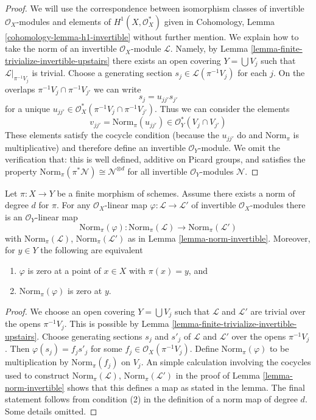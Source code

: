 \begin{proof}
We will use the correspondence between isomorphism classes of
invertible $\mathcal{O}_X$-modules and elements of
$H^1(X, \mathcal{O}_X^*)$ given in
Cohomology, Lemma \ref{cohomology-lemma-h1-invertible}
without further mention. We explain how to take the norm of an invertible
$\mathcal{O}_X$-module $\mathcal{L}$. Namely, by
Lemma \ref{lemma-finite-trivialize-invertible-upstairs}
there exists an open covering $Y = \bigcup V_j$ such that
$\mathcal{L}|_{\pi^{-1}V_j}$ is trivial. Choose a generating section
$s_j \in \mathcal{L}(\pi^{-1}V_j)$ for each $j$.
On the overlaps $\pi^{-1}V_j \cap \pi^{-1}V_{j'}$ we can write
$$
s_j = u_{jj'} s_{j'}
$$
for a unique $u_{jj'} \in \mathcal{O}^*_X(\pi^{-1}V_j \cap \pi^{-1}V_{j'})$.
Thus we can consider the elements
$$
v_{jj'} = \text{Norm}_\pi(u_{jj'}) \in \mathcal{O}_Y^*(V_j \cap V_{j'})
$$
These elements satisfy the cocycle condition (because the
$u_{jj'}$ do and $\text{Norm}_\pi$ is multiplicative) and
therefore define an invertible $\mathcal{O}_Y$-module.
We omit the verification that: this is well defined,
additive on Picard groups, and satisfies the property
$\text{Norm}_\pi(\pi^*\mathcal{N}) \cong \mathcal{N}^{\otimes d}$
for all invertible $\mathcal{O}_Y$-modules $\mathcal{N}$.
\end{proof}

\begin{lemma}
\label{lemma-norm-map-invertible}
Let $\pi : X \to Y$ be a finite morphism of schemes. Assume there exists
a norm of degree $d$ for $\pi$. For any $\mathcal{O}_X$-linear map
$\varphi : \mathcal{L} \to \mathcal{L}'$
of invertible $\mathcal{O}_X$-modules there is an $\mathcal{O}_Y$-linear
map
$$
\text{Norm}_\pi(\varphi) :
\text{Norm}_\pi(\mathcal{L})
\longrightarrow
\text{Norm}_\pi(\mathcal{L}')
$$
with $\text{Norm}_\pi(\mathcal{L})$, $\text{Norm}_\pi(\mathcal{L}')$
as in Lemma \ref{lemma-norm-invertible}. Moreover, for
$y \in Y$ the following are equivalent
\begin{enumerate}
\item $\varphi$ is zero at a point of $x \in X$ with $\pi(x) = y$, and
\item $\text{Norm}_\pi(\varphi)$ is zero at $y$.
\end{enumerate}
\end{lemma}

\begin{proof}
We choose an open covering $Y = \bigcup V_j$ such that
$\mathcal{L}$ and $\mathcal{L}'$ are trivial over the opens $\pi^{-1}V_j$.
This is possible by
Lemma \ref{lemma-finite-trivialize-invertible-upstairs}.
Choose generating sections
$s_j$ and $s'_j$ of $\mathcal{L}$ and $\mathcal{L}'$
over the opens $\pi^{-1}V_j$. Then $\varphi(s_j) = f_js'_j$
for some $f_j \in \mathcal{O}_X(\pi^{-1}V_j)$.
Define $\text{Norm}_\pi(\varphi)$ to be multiplication
by $\text{Norm}_\pi(f_j)$ on $V_j$. An simple
calculation involving the cocycles used to construct
$\text{Norm}_\pi(\mathcal{L})$, $\text{Norm}_\pi(\mathcal{L}')$
in the proof of Lemma \ref{lemma-norm-invertible}
shows that this defines
a map as stated in the lemma. The final statement follows
from condition (2) in the definition of a norm map of degree $d$.
Some details omitted.
\end{proof}

